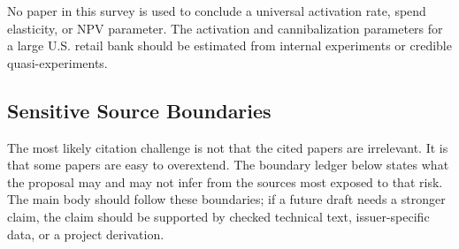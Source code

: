 \documentclass[11pt]{article}
\newcommand{\1}{\mathbf{1}}
\begin{document}
No paper in this survey is used to conclude a universal activation rate, spend
elasticity, or NPV parameter. The activation and cannibalization parameters for
a large U.S. retail bank should be estimated from internal experiments or
credible quasi-experiments.

\subsection*{Sensitive Source Boundaries}

The most likely citation challenge is not that the cited papers are irrelevant.
It is that some papers are easy to overextend. The boundary ledger below states
what the proposal may and may not infer from the sources most exposed to that
risk. The main body should follow these boundaries; if a future draft needs a
stronger claim, the claim should be supported by checked technical text,
issuer-specific data, or a project derivation.
\end{document}

